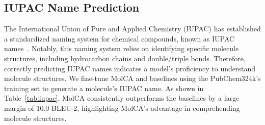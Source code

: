 \documentclass[11pt]{article}
\begin{document}
\subsection{IUPAC Name Prediction}
The International Union of Pure and Applied Chemistry (IUPAC) has established a standardized naming system for chemical compounds, known as IUPAC names~\citep{IUPACName}. Notably, this naming system relies on identifying specific molecule structures, including hydrocarbon chains and double/triple bonds. Therefore, correctly predicting IUPAC names indicates a model's proficiency to understand molecule structures. We fine-tune MolCA and baselines using the PubChem324k's training set to generate a molecule's IUPAC name. As shown in Table~\ref{tab:iupac}, MolCA consistently outperforms the baselines by a large margin of 10.0 BLEU-2, highlighting MolCA's advantage in comprehending molecule structures.
\end{document}
